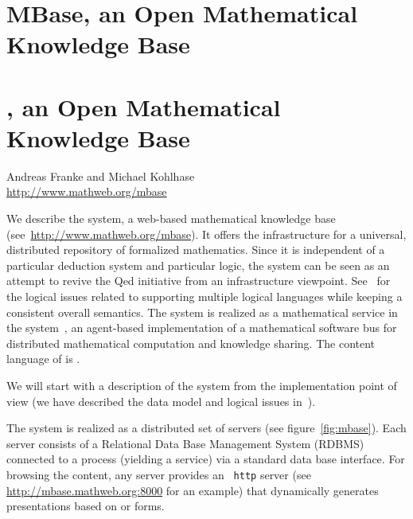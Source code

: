 \ifpdf\section{MBase, an Open Mathematical Knowledge Base}
\else\section{{\mbase}, an Open Mathematical Knowledge Base}\fi\label{sec:mbase}
\begin{center}\large\sf Andreas Franke and Michael Kohlhase\\
\url{http://www.mathweb.org/mbase}
\end{center}

We describe the {\mbase} system, a web-based mathematical knowledge base
(see~\url{http://www.mathweb.org/mbase}). It offers the infrastructure for a
universal, distributed repository of formalized mathematics. Since it is
independent of a particular deduction system and particular logic, the {\mbase}
system can be seen as an attempt to revive the {\sc Qed} initiative from an
infrastructure viewpoint. See~\cite{KohFra:rkcimss00} for the logical issues
related to supporting multiple logical languages while keeping a consistent
overall semantics. The system is realized as a mathematical service in the
{\mathweb} system~\cite{FraKoh:mabdl99}, an agent-based implementation of a
mathematical software bus for distributed mathematical computation and knowledge
sharing. The content language of {\mbase} is {\omdoc}.

We will start with a description of the system from the implementation point of
view (we have described the data model and logical issues
in~\cite{KohFra:rkcimss00}).  

The {\mbase} system is realized as a distributed set of {\mbase} servers (see
figure~\ref{fig:mbase}). Each {\mbase} server consists of a Relational Data Base
Management System (RDBMS) connected to a {\mozart} process
(yielding a {\mathweb} service) via a standard data base interface.
For browsing the {\mbase} content, any {\mbase} server provides an {\tt
  http} server (see {\url{http://mbase.mathweb.org:8000}} for an example) that
dynamically generates presentations based on {\html} or {\xml} forms.

